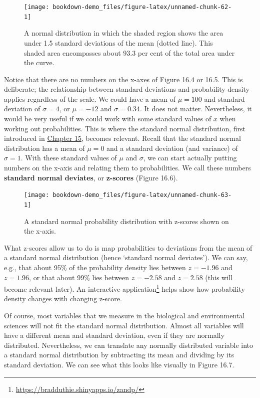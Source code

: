 \documentclass[
  openany]{scrbook}
\begin{document}
\begin{figure}
\texttt{[image: bookdown-demo\_files/figure-latex/unnamed-chunk-62-1]} \caption{A normal distribution in which the shaded region shows the area under 1.5 standard deviations of the mean (dotted line). This shaded area encompasses about 93.3 per cent of the total area under the curve.}\label{fig:unnamed-chunk-62}
\end{figure}

Notice that there are no numbers on the x-axes of Figure 16.4 or 16.5.
This is deliberate; the relationship between standard deviations and probability density applies regardless of the scale.
We could have a mean of \(\mu = 100\) and standard deviation of \(\sigma = 4\), or \(\mu = -12\) and \(\sigma = 0.34\).
It does not matter.
Nevertheless, it would be very useful if we could work with some standard values of \(x\) when working out probabilities.
This is where the standard normal distribution, first introduced in \protect\hyperlink{Chapter_15}{Chapter 15}, becomes relevant.
Recall that the standard normal distribution has a mean of \(\mu = 0\) and a standard deviation (and variance) of \(\sigma = 1\).
With these standard values of \(\mu\) and \(\sigma\), we can start actually putting numbers on the x-axis and relating them to probabilities.
We call these numbers \textbf{standard normal deviates}, or \textbf{z-scores} (Figure 16.6).

\begin{figure}
\texttt{[image: bookdown-demo\_files/figure-latex/unnamed-chunk-63-1]} \caption{A standard normal probability distribution with z-scores shown on the x-axis.}\label{fig:unnamed-chunk-63}
\end{figure}

What z-scores allow us to do is map probabilities to deviations from the mean of a standard normal distribution (hence `standard normal deviates').
We can say, e.g., that about 95\% of the probability density lies between \(z = -1.96\) and \(z = 1.96\), or that about 99\% lies between \(z = -2.58\) and \(z = 2.58\) (this will become relevant later).
An interactive application\footnote{\url{https://bradduthie.shinyapps.io/zandp/}} helps show how probability density changes with changing z-score.

Of course, most variables that we measure in the biological and environmental sciences will not fit the standard normal distribution.
Almost all variables will have a different mean and standard deviation, even if they are normally distributed.
Nevertheless, we can translate any normally distributed variable into a standard normal distribution by subtracting its mean and dividing by its standard deviation.
We can see what this looks like visually in Figure 16.7.
\end{document}
